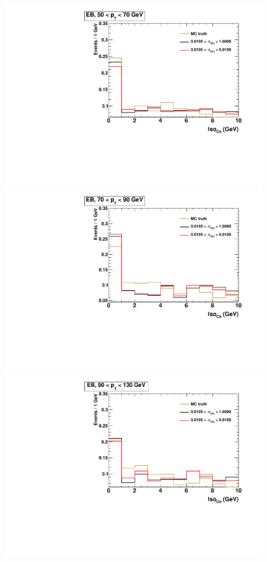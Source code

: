 \begin{figure}[!htbp]
	\noindent
	\centering
	\begin{multicols}{2}
		\includegraphics[scale=0.29]{figures/closure_test_fake_template_chIso_EB_pt50To70_sample_all.pdf} \\
		\includegraphics[scale=0.29]{figures/closure_test_fake_template_chIso_EB_pt70To90_sample_all.pdf} \\
		\includegraphics[scale=0.29]{figures/closure_test_fake_template_chIso_EB_pt90To130_sample_all.pdf} \\

\end{multicols}
\end{figure}
